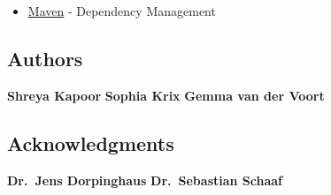 \begin{itemize}
\tightlist
\item
  \href{https://maven.apache.org/}{Maven} - Dependency Management
\end{itemize}

\hypertarget{authors}{%
\subsection{Authors}\label{authors}}

\textbf{Shreya Kapoor} \textbf{Sophia Krix} \textbf{Gemma van der Voort}

\hypertarget{acknowledgments}{%
\subsection{Acknowledgments}\label{acknowledgments}}

\textbf{Dr.~Jens Dorpinghaus} \textbf{Dr.~Sebastian Schaaf}
